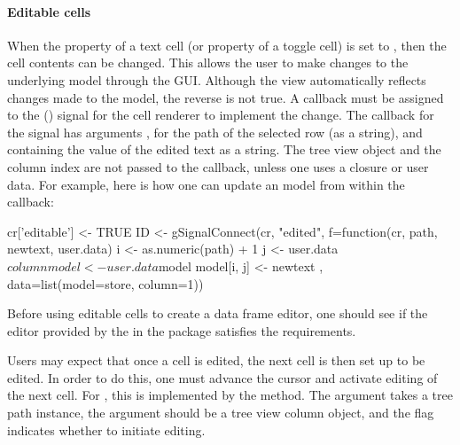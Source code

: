\paragraph{Editable cells} When the  property of a text
cell (or  property of a toggle cell) is set to
, then the cell contents can be changed. This allows the
user to make changes to the underlying model through the GUI. Although
the view automatically reflects changes made to the model, the reverse
is not true. A callback must be assigned to the 
() signal for the cell renderer to implement the
change. The callback for the  signal has arguments
,  for the path of the selected row (as a
string), and  containing the value of the edited text
as a string. The tree view object and the column index are not passed
to the callback, unless one uses a closure or user data.
For example, here is how one can update an  model
from within the callback:
\begin{Schunk}
\begin{Sinput}
 cr['editable'] <- TRUE
 ID <- gSignalConnect(cr, "edited", 
 f=function(cr, path, newtext, user.data) {
   i <- as.numeric(path) + 1
   j <- user.data$column
   model <- user.data$model
   model[i, j] <- newtext
 }, data=list(model=store, column=1))
\end{Sinput}
\end{Schunk}
% 
Before using editable cells to create a data frame editor, one should
see if the editor provided by the  in the
 package satisfies the requirements.

Users may expect that once a cell is edited, the next cell is then set
up to be edited. In order to do this, one must advance the cursor and
activate editing of the next cell. For , this is
implemented by the  method. The
 argument takes a tree path instance, the 
argument should be a tree view column object, and the flag
 indicates whether to initiate editing.

